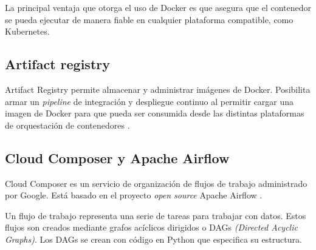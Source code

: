 La principal ventaja que otorga el uso de Docker es que asegura que el contenedor se pueda ejecutar de manera fiable en cualquier plataforma compatible, como Kubernetes.

\subsection{Artifact registry}

Artifact Registry permite almacenar y administrar imágenes de Docker. Posibilita armar un \textit{pipeline} de integración y despliegue continuo al permitir cargar una imagen de Docker para que pueda ser consumida desde las distintas plataformas de orquestación de contenedores \citep{WEBSITE:36}.

\subsection{Cloud Composer y Apache Airflow}

Cloud Composer es un servicio de organización de flujos de trabajo administrado por Google. Está basado en el proyecto \textit{open source} Apache Airflow \citep{WEBSITE:31}. 

Un flujo de trabajo representa una serie de tareas para trabajar con datos. Estos flujos son creados mediante grafos acíclicos dirigidos o DAGs \textit{(Directed Acyclic Graphs)}. Los DAGs se crean con código en Python que especifica su estructura.